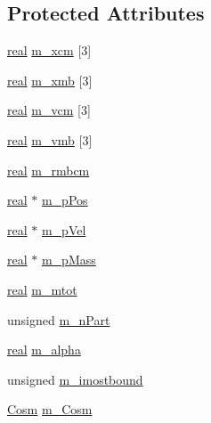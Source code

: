 \subsection*{Protected Attributes}
\begin{DoxyCompactItemize}
\item 
\hyperlink{Global_8h_a031f8951175b43076c2084a6c2173410}{real} \hyperlink{classHaloProperties_ad839c03623bf7980cc14a7fa5ea2fdc2}{m\_\-xcm} \mbox{[}3\mbox{]}
\item 
\hyperlink{Global_8h_a031f8951175b43076c2084a6c2173410}{real} \hyperlink{classHaloProperties_a3936de59491d4fb5c0688b10d9652d40}{m\_\-xmb} \mbox{[}3\mbox{]}
\item 
\hyperlink{Global_8h_a031f8951175b43076c2084a6c2173410}{real} \hyperlink{classHaloProperties_a367b37a34cf13626d6a6f008daadedf4}{m\_\-vcm} \mbox{[}3\mbox{]}
\item 
\hyperlink{Global_8h_a031f8951175b43076c2084a6c2173410}{real} \hyperlink{classHaloProperties_a17b99f065e4e45eda4a15d2cdf8adef4}{m\_\-vmb} \mbox{[}3\mbox{]}
\item 
\hyperlink{Global_8h_a031f8951175b43076c2084a6c2173410}{real} \hyperlink{classHaloProperties_a69b8eeefabab51e75c49e644e90e2eb6}{m\_\-rmbcm}
\item 
\hyperlink{Global_8h_a031f8951175b43076c2084a6c2173410}{real} $\ast$ \hyperlink{classHaloProperties_a5bf86b564f3d107d35065d71c80ebf1e}{m\_\-pPos}
\item 
\hyperlink{Global_8h_a031f8951175b43076c2084a6c2173410}{real} $\ast$ \hyperlink{classHaloProperties_a87d16b6da2b2442e69e340623a002021}{m\_\-pVel}
\item 
\hyperlink{Global_8h_a031f8951175b43076c2084a6c2173410}{real} $\ast$ \hyperlink{classHaloProperties_ac03a9f5783b159c09a1cdadf847d2444}{m\_\-pMass}
\item 
\hyperlink{Global_8h_a031f8951175b43076c2084a6c2173410}{real} \hyperlink{classHaloProperties_a49159fd8ceb9bcb6693ed3a3070320b5}{m\_\-mtot}
\item 
unsigned \hyperlink{classHaloProperties_afffcd47e8ef37f5e1fb5a395e1fdd6ca}{m\_\-nPart}
\item 
\hyperlink{Global_8h_a031f8951175b43076c2084a6c2173410}{real} \hyperlink{classHaloProperties_af1ec4657f196c3bcf725200a0f4206d9}{m\_\-alpha}
\item 
unsigned \hyperlink{classHaloProperties_aaf7437a2b095bad02f2c423d834fbec2}{m\_\-imostbound}
\item 
\hyperlink{structHaloProperties_1_1Cosm}{Cosm} \hyperlink{classHaloProperties_ac5f3f646bdff517eced133857ad03a0d}{m\_\-Cosm}
\end{DoxyCompactItemize}


